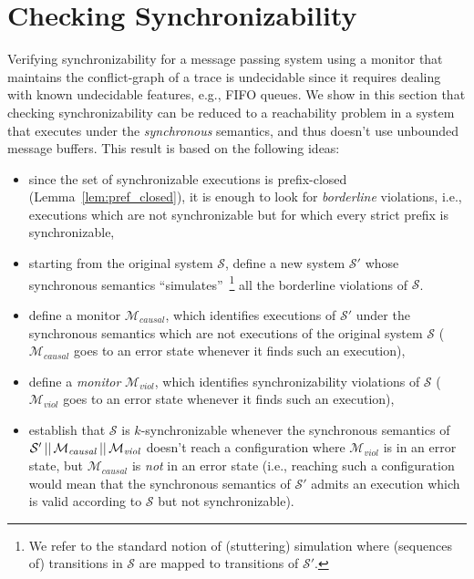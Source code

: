 \section{Checking Synchronizability}

Verifying synchronizability for a message passing system using a monitor that maintains the conflict-graph of a trace 
is undecidable since it requires dealing with known undecidable features, e.g., FIFO queues.
We show in this section that checking synchronizability can be reduced 
to a reachability problem in a system that executes under the \emph{synchronous} semantics, and 
thus doesn't use unbounded message buffers. This result is based on the following ideas:
\begin{itemize}
	\item since the set of synchronizable executions is prefix-closed (Lemma~\ref{lem:pref_closed}), it is enough to look for \emph{borderline} violations, i.e., executions which
are not synchronizable but for which every strict prefix is synchronizable,
	\item starting from the original system $\mathcal{S}$, define a new system $\mathcal{S'}$ whose synchronous semantics ``simulates''~\footnote{We refer to the standard notion of (stuttering) simulation where (sequences of) transitions in $\mathcal{S}$ are mapped to transitions of $\mathcal{S'}$.} all the borderline violations of $\mathcal{S}$. 
	\item define a monitor $\mathcal{M}_{\mathit{causal}}$, which identifies executions of $\mathcal{S'}$ under the synchronous semantics
which are not executions of the original system $\mathcal{S}$ ($\mathcal{M}_{\mathit{causal}}$ goes to an error state whenever it finds such 
an execution), 
	\item define a \emph{monitor} $\mathcal{M}_{\mathit{viol}}$, which identifies synchronizability violations of $\mathcal{S}$ 
($\mathcal{M}_{\mathit{viol}}$ goes to an error state whenever it finds such an execution),
	\item establish that $\mathcal{S}$ is $k$-synchronizable whenever the synchronous semantics of $\mathcal{S'}\,||\, \mathcal{M}_{\mathit{causal}}\,||\, \mathcal{M}_{\mathit{viol}}$
doesn't reach a configuration where $\mathcal{M}_{\mathit{viol}}$ is in an error state, but $\mathcal{M}_{\mathit{causal}}$ is \emph{not} in an error state 
(i.e., reaching such a configuration would mean that the synchronous semantics of $\mathcal{S'}$ admits an execution which is valid according to $\mathcal{S}$ but not synchronizable). 
\end{itemize}

